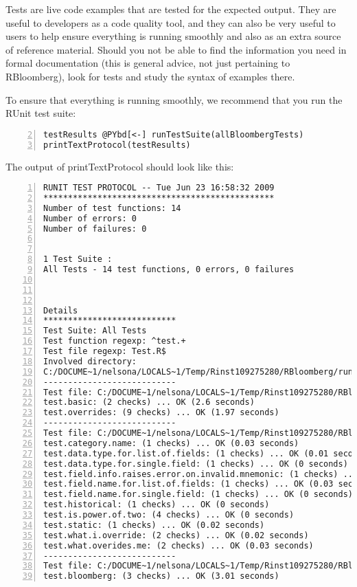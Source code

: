 \documentclass[a4paper]{article}
\begin{document}
Tests are live code examples that are tested for the expected output. They are useful to developers as a code quality tool, and they can also be very useful to users to help ensure everything is running smoothly and also as an extra source of reference material. Should you not be able to find the information you need in formal documentation (this is general advice, not just pertaining to RBloomberg), look for tests and study the syntax of examples there.

To ensure that everything is running smoothly, we recommend that you run the RUnit test suite:

\begin{Verbatim}[commandchars=@\[\],numbers=left,firstnumber=2,stepnumber=1]
testResults @PYbd[<-] runTestSuite(allBloombergTests)
printTextProtocol(testResults)
\end{Verbatim}

    

The output of printTextProtocol should look like this:

\begin{Verbatim}[commandchars=@\[\],numbers=left,firstnumber=1,stepnumber=1]
RUNIT TEST PROTOCOL -- Tue Jun 23 16:58:32 2009 
*********************************************** 
Number of test functions: 14 
Number of errors: 0 
Number of failures: 0 

 
1 Test Suite : 
All Tests - 14 test functions, 0 errors, 0 failures



Details 
*************************** 
Test Suite: All Tests 
Test function regexp: ^test.+ 
Test file regexp: Test.R$ 
Involved directory: 
C:/DOCUME~1/nelsona/LOCALS~1/Temp/Rinst109275280/RBloomberg/runit-tests 
--------------------------- 
Test file: C:/DOCUME~1/nelsona/LOCALS~1/Temp/Rinst109275280/RBloomberg/runit-tests/blpGetDataTest.R 
test.basic: (2 checks) ... OK (2.6 seconds)
test.overrides: (9 checks) ... OK (1.97 seconds)
--------------------------- 
Test file: C:/DOCUME~1/nelsona/LOCALS~1/Temp/Rinst109275280/RBloomberg/runit-tests/blpToolsTest.R 
test.category.name: (1 checks) ... OK (0.03 seconds)
test.data.type.for.list.of.fields: (1 checks) ... OK (0.01 seconds)
test.data.type.for.single.field: (1 checks) ... OK (0 seconds)
test.field.info.raises.error.on.invalid.mnemonic: (1 checks) ... OK (0 seconds)
test.field.name.for.list.of.fields: (1 checks) ... OK (0.03 seconds)
test.field.name.for.single.field: (1 checks) ... OK (0 seconds)
test.historical: (1 checks) ... OK (0 seconds)
test.is.power.of.two: (4 checks) ... OK (0 seconds)
test.static: (1 checks) ... OK (0.02 seconds)
test.what.i.override: (2 checks) ... OK (0.02 seconds)
test.what.overides.me: (2 checks) ... OK (0.03 seconds)
--------------------------- 
Test file: C:/DOCUME~1/nelsona/LOCALS~1/Temp/Rinst109275280/RBloomberg/runit-tests/rcomBloombergTest.R 
test.bloomberg: (3 checks) ... OK (3.01 seconds)
\end{Verbatim}
\end{document}
